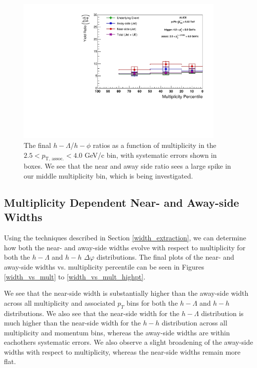 \documentclass[ALICE,manyauthors]{ALICE_analysis_notes}
\begin{document}
\begin{figure}[ht]
\centering
\includegraphics[width=4in]{figures/lambda_phi_ratio_plot_highpt.pdf}
\caption{The final $h-\Lambda$/$h-\phi$ ratios as a function of multiplicity in the $2.5 < p_{\text{T, assoc.}} < 4.0$ GeV/c bin, with systematic errors shown in boxes. We see that the near and away side ratio sees a large spike in our middle multiplicity bin, which is being investigated.}
\label{lambda_phi_ratio_highpt}
\end{figure}
\clearpage

\subsection{Multiplicity Dependent Near- and Away-side Widths}
Using the techniques described in Section \ref{width_extraction}, we can determine how both the near- and away-side widths evolve with respect to multiplicity for both the $h-\Lambda$ and $h-h$ $\Delta\varphi$ distributions. The final plots of the near- and away-side widths vs. multiplicity percentile can be seen in Figures \ref{width_vs_mult} to \ref{width_vs_mult_highpt}.

We see that the near-side width is substantially higher than the away-side width across all multiplicity and associated $p_{T}$ bins for both the $h-\Lambda$ and $h-h$ distributions. We also see that the near-side width for the $h-\Lambda$ distribution is much higher than the near-side width for the $h-h$ distribution across all multiplicity and momentum bins, whereas the away-side widths are within eachothers systematic errors. We also observe a slight broadening of the away-side widths with respect to multiplicity, whereas the near-side widths remain more flat. 
\end{document}
